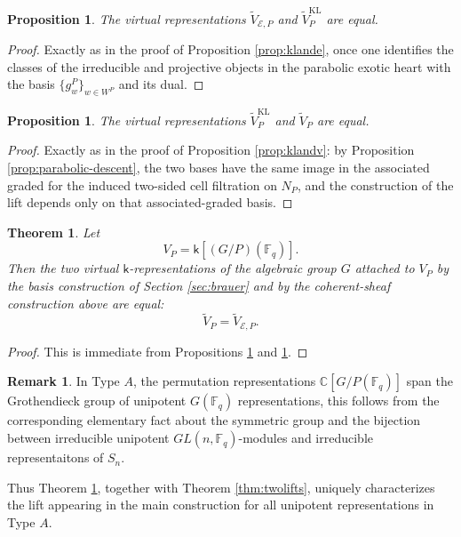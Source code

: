 \documentclass{amsart}
\newtheorem{theorem}[thm]{Theorem}
\newtheorem{prop}[thm]{Proposition}
\theoremstyle{definition}
\newtheorem{remark}[thm]{Remark}
\newcommand{\Ce}{\mathbb{C}}
\begin{document}
\begin{prop}\label{prop:gp-klande}
The virtual representations $\tilde V_{\mathcal E,P}$ and
$\tilde V_P^{\mathrm{KL}}$ are equal.
\end{prop}

\begin{proof}
Exactly as in the proof of Proposition \ref{prop:klande}, once one identifies
the classes of the irreducible and projective objects in the parabolic exotic heart
with the basis $\{g_w^P\}_{w\in W^P}$ and its dual.
\end{proof}

\begin{prop}\label{prop:gp-klandv}
The virtual representations $\tilde V_P^{\mathrm{KL}}$ and $\tilde V_P$ are equal.
\end{prop}

\begin{proof}
Exactly as in the proof of Proposition \ref{prop:klandv}: by
Proposition \ref{prop:parabolic-descent}, the two bases have the same image in the
associated graded for the induced two-sided cell filtration on $N_P$, and the
construction of the lift depends only on that associated-graded basis.
\end{proof}

\begin{theorem}\label{thm:twoliftsP}
Let
\[
V_P=\mathsf{k}[(G/P)(\mathbb{F}_q)].
\]
Then the two virtual $\mathsf{k}$-representations of the algebraic group $G$
attached to $V_P$ by the basis construction of Section \ref{sec:brauer}
and by the coherent-sheaf construction above are equal:
\[
\tilde V_P=\tilde V_{\mathcal E,P}.
\]
\end{theorem}

\begin{proof}
This is immediate from Propositions \ref{prop:gp-klande} and
\ref{prop:gp-klandv}.
\end{proof}

\begin{remark} In Type $A$, the permutation representations $\Ce[G/P(\mathbb{F}_q)]$
span the Grothendieck group of unipotent $G(\mathbb{F}_q)$ representations, this follows
from the corresponding elementary fact about the symmetric group and the bijection
between irreducible unipotent $GL(n,\mathbb{F}_q)$-modules and irreducible representaitons of
$S_n$.


Thus Theorem \ref{thm:twoliftsP}, together with Theorem \ref{thm:twolifts},
uniquely characterizes the lift appearing in the main construction for all unipotent representations in Type $A$.
\end{remark}
\end{document}
